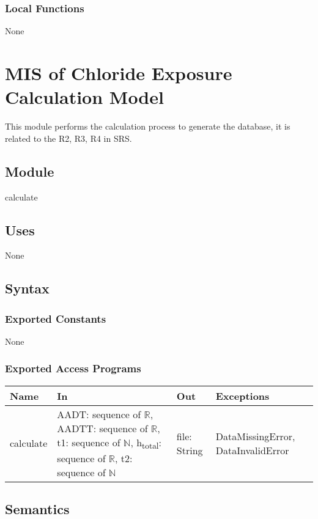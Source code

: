\documentclass[12pt, titlepage]{article}
\begin{document}
\subsubsection{Local Functions}
None
\newpage

\section{MIS of Chloride Exposure Calculation Model} \label{calculationModule}
This module performs the calculation process to generate the database, it is related to the R2, R3, R4 in SRS.

\subsection{Module}

calculate

\subsection{Uses}

None

\subsection{Syntax}

\subsubsection{Exported Constants}
None
\subsubsection{Exported Access Programs}

\begin{center}
\begin{tabular}{p{2cm} p{4cm} p{4cm} p{4cm}}
\hline
\textbf{Name} & \textbf{In} & \textbf{Out} & \textbf{Exceptions} \\
\hline
calculate & AADT: sequence of $\mathbb{R}$, AADTT: sequence of $\mathbb{R}$, t1: sequence of $\mathbb{N}$, h\textsubscript{total}: sequence of $\mathbb{R}$, t2: sequence of $\mathbb{N}$ & file: String & DataMissingError, DataInvalidError \\
\hline
\end{tabular}
\end{center}

\subsection{Semantics}
\end{document}
